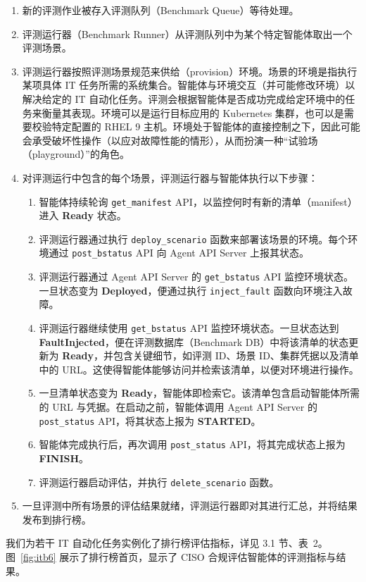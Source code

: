 \documentclass[10pt,UTF8,fontset=fandol]{ctexart}
\begin{document}
\begin{enumerate}
\item 新的评测作业被存入评测队列（Benchmark Queue）等待处理。
\item 评测运行器（Benchmark Runner）从评测队列中为某个特定智能体取出一个评测场景。
\item 评测运行器按照评测场景规范来供给（provision）环境。场景的环境是指执行某项具体 IT 任务所需的系统集合。智能体与环境交互（并可能修改环境）以解决给定的 IT 自动化任务。评测会根据智能体是否成功完成给定环境中的任务来衡量其表现。环境可以是运行目标应用的 Kubernetes 集群，也可以是需要校验特定配置的 RHEL 9 主机。环境处于智能体的直接控制之下，因此可能会承受破坏性操作（以应对故障性能的情形），从而扮演一种“试验场（playground）”的角色。
\item 对评测运行中包含的每个场景，评测运行器与智能体执行以下步骤：
\begin{enumerate}
\item[(a)] 智能体持续轮询 \texttt{get\_manifest} API，以监控何时有新的清单（manifest）进入 \textbf{Ready} 状态。
\item[(b)] 评测运行器通过执行 \texttt{deploy\_scenario} 函数来部署该场景的环境。每个环境通过 \texttt{post\_bstatus} API 向 Agent API Server 上报其状态。
\item[(c)] 评测运行器通过 Agent API Server 的 \texttt{get\_bstatus} API 监控环境状态。一旦状态变为 \textbf{Deployed}，便通过执行 \texttt{inject\_fault} 函数向环境注入故障。
\item[(d)] 评测运行器继续使用 \texttt{get\_bstatus} API 监控环境状态。一旦状态达到 \textbf{FaultInjected}，便在评测数据库（Benchmark DB）中将该清单的状态更新为 \textbf{Ready}，并包含关键细节，如评测 ID、场景 ID、集群凭据以及清单中的 URL。这使得智能体能够访问并检索该清单，以便对环境进行操作。
\item[(e)] 一旦清单状态变为 \textbf{Ready}，智能体即检索它。该清单包含启动智能体所需的 URL 与凭据。在启动之前，智能体调用 Agent API Server 的 \texttt{post\_status} API，将其状态上报为 \textbf{STARTED}。
\item[(f)] 智能体完成执行后，再次调用 \texttt{post\_status} API，将其完成状态上报为 \textbf{FINISH}。
\item[(g)] 评测运行器启动评估，并执行 \texttt{delete\_scenario} 函数。
\end{enumerate}
\item 一旦评测中所有场景的评估结果就绪，评测运行器即对其进行汇总，并将结果发布到排行榜。
\end{enumerate}

我们为若干 IT 自动化任务实例化了排行榜评估指标，详见 3.1 节、表~2。图~\ref{fig:itb6} 展示了排行榜首页，显示了 CISO 合规评估智能体的评测指标与结果。
\end{document}
